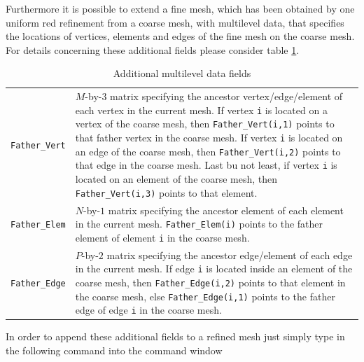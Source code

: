  Furthermore it is possible to extend a fine mesh, which has been obtained by one uniform red refinement from a coarse mesh, with multilevel data, that specifies the locations of vertices, elements and edges of the fine mesh on the coarse mesh. For details concerning these additional fields please consider table \ref{tab:MLEVEL}.

\begin{table}[htb]
  \begin{tabular}{p{2cm}p{9cm}}
    {\tt Father\_Vert} & \small $M$-by-$3$ matrix specifying the ancestor vertex/edge/element of each vertex
                         in the current mesh. If vertex {\tt i} is located on a vertex of the coarse mesh,
                         then {\tt Father\_Vert(i,1)} points to that father vertex in the coarse mesh.
                         If vertex {\tt i} is located on an edge of the coarse mesh, then {\tt Father\_Vert(i,2)}
                         points to that edge in the coarse mesh. Last bu not least, if vertex {\tt i} is located
                         on an element of the coarse mesh, then {\tt Father\_Vert(i,3)} points to that element.     \\
    {\tt Father\_Elem} & \small $N$-by-$1$ matrix specifying the ancestor element of each element in the current
                         mesh. {\tt Father\_Elem(i)} points to the father element of element {\tt i} in the coarse
                         mesh.                                                                                         \\
    {\tt Father\_Edge} & \small $P$-by-$2$ matrix specifying the ancestor edge/element of each edge in the
                         current mesh. If edge {\tt i} is located inside an element of the coarse mesh, then
                         {\tt Father\_Edge(i,2)} points to that element in the coarse mesh, else
                         {\tt Father\_Edge(i,1)} points to the father edge of edge {\tt i} in the coarse mesh.
  \end{tabular}
  \caption{Additional multilevel data fields}
  \label{tab:MLEVEL}
\end{table}

 {\noindent} In order to append these additional fields to a refined mesh just simply type in the following command into the \MATLAB command window \\

 \\

